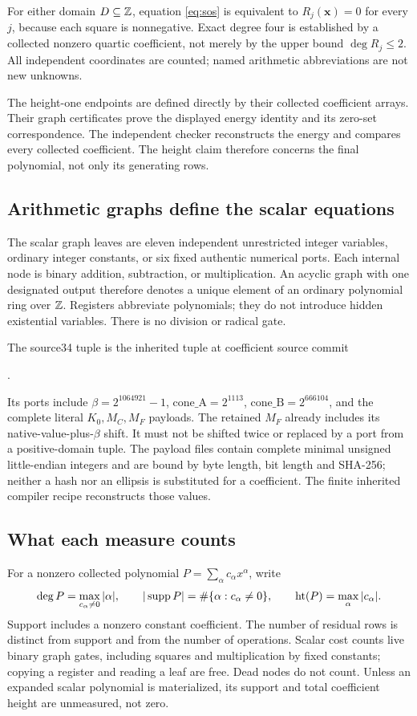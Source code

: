 For either domain $D\subseteq\mathbb Z$, equation \eqref{eq:sos} is equivalent to
$R_j(\boldsymbol{x})=0$ for every $j$, because each square is nonnegative.
Exact degree four is established by a collected nonzero quartic coefficient,
not merely by the upper bound $\deg R_j\le2$. All independent coordinates
are counted; named arithmetic abbreviations are not new unknowns.

The height-one endpoints are defined directly by their collected coefficient
arrays. Their graph certificates prove the displayed energy identity and
its zero-set correspondence. The independent checker reconstructs the
energy and compares every collected coefficient. The height claim therefore
concerns the final polynomial, not only its generating rows.

\subsection{Arithmetic graphs define the scalar equations}
The scalar graph leaves are eleven independent unrestricted integer
variables, ordinary integer constants, or six fixed authentic numerical
ports. Each internal node is binary addition, subtraction, or multiplication.
An acyclic graph with one designated output therefore denotes a unique
element of an ordinary polynomial ring over $\mathbb Z$. Registers abbreviate
polynomials; they do not introduce hidden existential variables. There is
no division or radical gate.

The source34 tuple is the inherited
 tuple at coefficient source commit
\begin{center}\small
{}.
\end{center}
Its ports include $\beta=2^{1064921}-1$,
$\mathrm{cone\_A}=2^{1113}$, $\mathrm{cone\_B}=2^{666104}$, and the complete
literal $K_0,M_C,M_F$ payloads. The retained $M_F$ already includes its
native-value-plus-$\beta$ shift. It must not be shifted twice or replaced by
a port from a positive-domain tuple. The payload files contain complete
minimal unsigned little-endian integers and are bound by byte length,
bit length and SHA-256; neither a hash nor an ellipsis is substituted for a
coefficient. The finite inherited compiler recipe reconstructs those values.

\subsection{What each measure counts}
For a nonzero collected polynomial $P=\sum_\alpha c_\alpha x^\alpha$, write
\[
 \deg P=\max_{c_\alpha\ne0}|\alpha|,\qquad
 |\operatorname{supp} P|=\#\{\alpha:c_\alpha\ne0\},\qquad
 \operatorname{ht}(P)=\max_\alpha|c_\alpha|.
\]
Support includes a nonzero constant coefficient. The number of residual
rows is distinct from support and from the number of operations. Scalar
cost counts live binary graph gates, including squares and multiplication
by fixed constants; copying a register and reading a leaf are free. Dead
nodes do not count. Unless an expanded scalar polynomial is materialized,
its support and total coefficient height are unmeasured, not zero.

